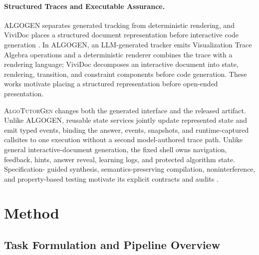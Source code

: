 \documentclass[letterpaper]{article}
\newcommand{\system}{\textsc{AlgoTutorGen}}
\begin{document}
\paragraph{Structured Traces and Executable Assurance.}
ALGOGEN separates generated tracking from deterministic rendering, and
ViviDoc places a structured document representation before interactive
code generation
\citep{liaokunpeng-etal-2026-algogen,tang2026vividoc}. In ALGOGEN, an
LLM-generated tracker emits Visualization Trace Algebra operations and
a deterministic renderer combines the trace with a rendering language;
ViviDoc decomposes an interactive document into state, rendering,
transition, and constraint components before code generation. These
works motivate placing a structured representation before open-ended
presentation.

\system{} changes both the generated interface and the released
artifact. Unlike ALGOGEN, reusable state services jointly update
represented state and emit typed events, binding the answer, events,
snapshots, and runtime-captured callsites to one execution without a
second model-authored trace path. Unlike general interactive-document
generation, the fixed shell owns navigation, feedback, hints, answer
reveal, learning logs, and protected algorithm state. Specification-
guided synthesis, semantics-preserving compilation, noninterference,
and property-based testing motivate its explicit contracts and audits
\citep{SolarLezama2006Sketch,Polikarpova2016Synquid,
Gulwani2017ProgramSynthesis,Leroy2009CompCert,
Goguen1982Noninterference,Claessen2000QuickCheck,
Segura2016Metamorphic}.

\section{Method}
\label{sec:method}

\subsection{Task Formulation and Pipeline Overview}
\label{sec:method_overview}
\end{document}
